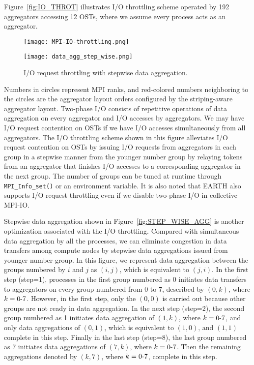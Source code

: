 \documentclass{jhps}
\begin{document}
Figure~\ref{fig:IO_THROT} illustrates
I/O throttling scheme operated by 192 aggregators accessing 12 OSTs,
where we assume every process acts as an aggregator.
%
\begin{figure}[tb]
\centering
\begin{minipage}[b]{0.45\textwidth}
\centering
\texttt{[image: MPI-IO-throttling.png]}
\label{fig:IO_THROT}
\end{minipage}
\noindent
\begin{minipage}[b]{0.45\textwidth}
\centering
\texttt{[image: data\_agg\_step\_wise.png]}
\label{fig:STEP_WISE_AGG}
\end{minipage}
\caption{I/O request throttling with stepwise data aggregation.}
\label{fig:IO_THROT_DATA_AGG}
\end{figure}
%
Numbers in circles represent MPI ranks, and red-colored numbers neighboring
to the circles are the aggregator layout orders configured by
the striping-aware aggregator layout.
Two-phase I/O consists of repetitive operations of
data aggregation on every aggregator and I/O accesses by aggregators.
We may have I/O request contention on OSTs
if we have I/O accesses simultaneously from all aggregators.
The I/O throttling scheme shown in this figure alleviates I/O request contention
on OSTs by issuing I/O requests from aggregators in each group in a stepwise manner
from the younger number group by relaying tokens from an aggregator that finishes
I/O accesses to a corresponding aggregator in the next group.
The number of groups can be tuned at runtime through {\tt MPI\_Info\_set()}
or an environment variable.
It is also noted that EARTH also supports I/O request throttling
even if we disable two-phase I/O in collective MPI-IO.

Stepwise data aggregation shown in
Figure~\ref{fig:STEP_WISE_AGG}
is another optimization associated with the I/O throttling.
Compared with simultaneous data aggregation by all the processes,
we can eliminate congestion in data transfers among compute nodes
by stepwise data aggregations issued from younger number group.
In this figure, we represent data aggregation between
the groups numbered by $i$ and $j$ as $(i,j)$,
which is equivalent to $(j,i)$.
In the first step (step=1), processes in the first group numbered as 0
initiates data transfers to aggregators on every group
numbered from 0 to 7, described by $(0,k)$, where $k=0\mathchar`-7$.
However, in the first step, only the $(0,0)$ is carried out
because other groups are not ready in data aggregation.
In the next step (step=2), the second group numbered as 1 initiates
data aggregation of $(1,k)$, where $k=0\mathchar`-7$,
and only data aggregations of $(0,1)$, which is equivalent to $(1,0)$,
and $(1,1)$ complete in this step.
Finally in the last step (step=8), the last group numbered as 7
initiates data aggregations of $(7,k)$, where $k=0\mathchar`-7$.
Then the remaining aggregations denoted by $(k,7)$,
where $k=0\mathchar`-7$, complete in this step.
\end{document}
